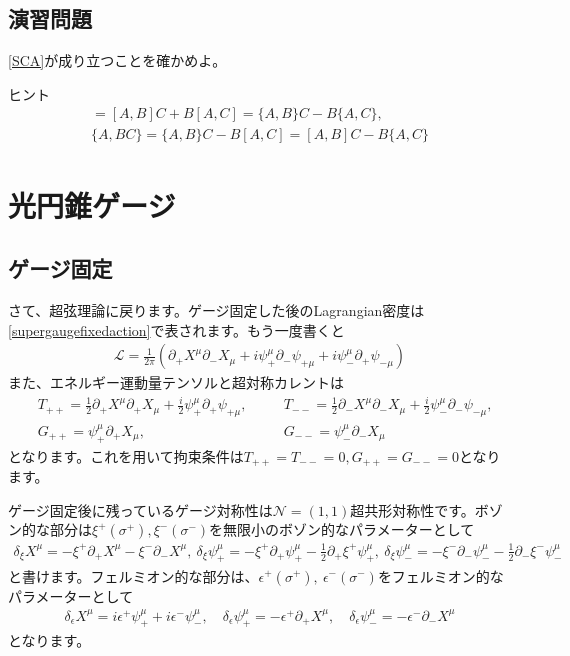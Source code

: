 \documentclass[report,paper=a4, fontsize=12pt, line_length=16cm, number_of_lines=33,dvipdfmx]{jlreq}
\numberwithin{equation}{chapter}
\numberwithin{equation}{section}
\newcommand{\Ncal}{\mathcal{N}}
\newcommand{\del}{\partial}
\newcommand{\Lcal}{\mathcal{L}}
\begin{document}
\subsection*{演習問題}
\eqref{SCA}が成り立つことを確かめよ。

ヒント
\begin{align}
  [A,BC]=[A,B]C+B[A,C]
   =\{A,B\}C-B\{A,C\},\\
  \{A,BC\}=\{A,B\}C-B[A,C]
  =[A,B]C-B\{A,C\}
\end{align}

\section{光円錐ゲージ}
\subsection{ゲージ固定}
さて、超弦理論に戻ります。ゲージ固定した後のLagrangian密度は\eqref{supergaugefixedaction}で表されます。もう一度書くと
\begin{align}
    \Lcal = \frac{1}{2\pi}\left( 
      \del_{+}X^{\mu}\del_{-}X_{\mu}+i\psi^{\mu}_{+}\del_{-}\psi_{+\mu}
      +i\psi^{\mu}_{-}\del_{+}\psi_{-\mu}
     \right)
     \label{supergaugefixedaction2}
\end{align}
また、エネルギー運動量テンソルと超対称カレントは
\begin{align}
  &T_{++}=\frac12\del_{+}X^{\mu}\del_{+}X_{\mu}+\frac{i}{2}\psi^{\mu}_{+}\del_{+}\psi_{+\mu},\quad &&
T_{--}=\frac12\del_{-}X^{\mu}\del_{-}X_{\mu}+\frac{i}{2}\psi^{\mu}_{-}\del_{-}\psi_{-\mu},\nonumber\\
&G_{++}=\psi^{\mu}_{+}\del_{+}X_{\mu},&&
G_{--}=\psi^{\mu}_{-}\del_{-}X_{\mu}
\end{align}    
となります。これを用いて拘束条件は$T_{++}=T_{--}=0,G_{++}=G_{--}=0$となります。

ゲージ固定後に残っているゲージ対称性は$\Ncal=(1,1)$超共形対称性です。ボゾン的な部分は$\xi^{+}(\sigma^{+}),\xi^{-}(\sigma^{-})$を無限小のボゾン的なパラメーターとして
\begin{align}
  \delta_{\xi}X^{\mu}=-\xi^{+}\del_{+}X^{\mu}-\xi^{-}\del_{-}X^{\mu},\ 
  \delta_{\xi}\psi^{\mu}_{+}=-\xi^{+}\del_{+}\psi^{\mu}_{+}-\frac12 \del_{+}\xi^{+}\psi^{\mu}_{+},\ 
  \delta_{\xi}\psi^{\mu}_{-}=-\xi^{-}\del_{-}\psi^{\mu}_{-}-\frac12 \del_{-}\xi^{-}\psi^{\mu}_{-}\label{superresifualtransformationbosonic2}
\end{align}    
と書けます。フェルミオン的な部分は、$\epsilon^{+}(\sigma^{+}),\ \epsilon^{-}(\sigma^{-})$をフェルミオン的なパラメーターとして
\begin{align}
  \delta_{\epsilon}X^{\mu}=i\epsilon^{+}\psi^{\mu}_{+}+i\epsilon^{-}\psi^{\mu}_{-}
  ,\quad
  \delta_{\epsilon}\psi^{\mu}_{+}=-\epsilon^{+}\del_{+}X^{\mu}
  ,\quad
  \delta_{\epsilon}\psi^{\mu}_{-}=-\epsilon^{-}\del_{-}X^{\mu}
  \label{superresidualtransformation2}
\end{align}    
となります。
\end{document}
